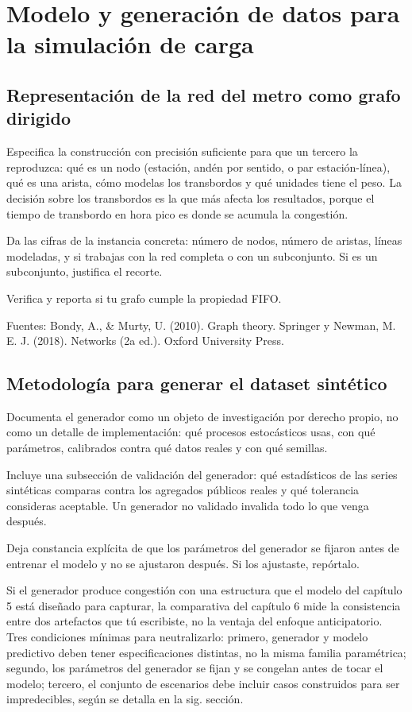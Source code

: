 \documentclass[letterpaper,12pt,oneside]{book}
\theoremstyle{definition}
\theoremstyle{plain}
\theoremstyle{remark}
\begin{document}
\chapter{Modelo y generación de datos para la simulación de carga}

\section{Representación de la red del metro como grafo dirigido}
Especifica la construcción con precisión suficiente para que un tercero la reproduzca: qué es un nodo (estación, andén por sentido, o par estación-línea), qué es una arista, cómo modelas los transbordos y qué unidades tiene el peso. La decisión sobre los transbordos es la que más afecta los resultados, porque el tiempo de transbordo en hora pico es donde se acumula la congestión.

Da las cifras de la instancia concreta: número de nodos, número de aristas, líneas modeladas, y si trabajas con la red completa o con un subconjunto. Si es un subconjunto, justifica el recorte.

Verifica y reporta si tu grafo cumple la propiedad FIFO.

Fuentes: Bondy, A., \& Murty, U. (2010). Graph theory. Springer y Newman, M. E. J. (2018). Networks (2a ed.). Oxford University Press.

\section{Metodología para generar el dataset sintético}

Documenta el generador como un objeto de investigación por derecho propio, no como un detalle de implementación: qué procesos estocásticos usas, con qué parámetros, calibrados contra qué datos reales y con qué semillas.

Incluye una subsección de validación del generador: qué estadísticos de las series sintéticas comparas contra los agregados públicos reales y qué tolerancia consideras aceptable. Un generador no validado invalida todo lo que venga después.

Deja constancia explícita de que los parámetros del generador se fijaron antes de entrenar el modelo y no se ajustaron después. Si los ajustaste, repórtalo.

Si el generador produce congestión con una estructura que el modelo del capítulo 5 está diseñado para capturar, la comparativa del capítulo 6 mide la consistencia entre dos artefactos que tú escribiste, no la ventaja del enfoque anticipatorio. Tres condiciones mínimas para neutralizarlo: primero, generador y modelo predictivo deben tener especificaciones distintas, no la misma familia paramétrica; segundo, los parámetros del generador se fijan y se congelan antes de tocar el modelo; tercero, el conjunto de escenarios debe incluir casos construidos para ser impredecibles, según se detalla en la sig. sección.
\end{document}

